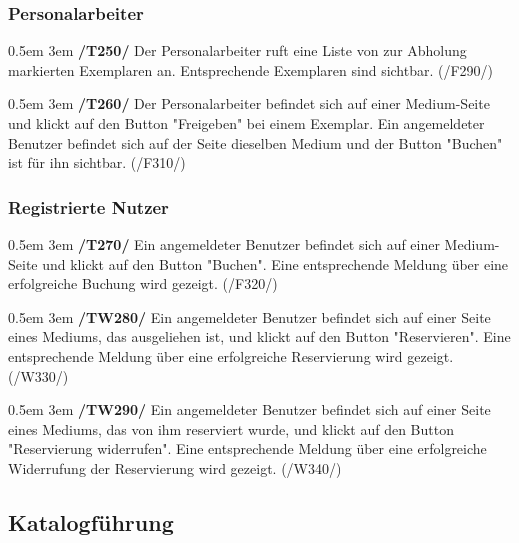 \documentclass{article}
\newcommand{\specification}[3]{
	{\parindent 0.5em \hangindent 3em \hypertarget{spec:#1:#2}{\textbf{/#1#2/}} #3 \par \nobreak \vspace*{0.5em}}
}
\begin{document}
		\subsubsection{Personalarbeiter}
			\specification{T}{250}{Der Personalarbeiter ruft eine Liste von zur Abholung markierten Exemplaren an. Entsprechende Exemplaren sind sichtbar. (/F290/)}
			\specification{T}{260}{Der Personalarbeiter befindet sich auf einer Medium-Seite und klickt auf den Button "Freigeben" bei einem Exemplar. Ein angemeldeter Benutzer befindet sich auf der Seite dieselben Medium und der Button "Buchen" ist für ihn sichtbar. (/F310/)}
		\subsubsection{Registrierte Nutzer}
			\specification{T}{270}{Ein angemeldeter Benutzer befindet sich auf einer Medium-Seite und klickt auf den Button "Buchen". Eine entsprechende Meldung über eine erfolgreiche Buchung wird gezeigt. (/F320/) }
			\specification{TW}{280}{Ein angemeldeter Benutzer befindet sich auf einer Seite eines Mediums, das ausgeliehen ist, und klickt auf den Button "Reservieren". Eine entsprechende Meldung über eine erfolgreiche Reservierung wird gezeigt. (/W330/) }
			\specification{TW}{290}{Ein angemeldeter Benutzer befindet sich auf einer Seite eines Mediums, das von ihm reserviert wurde, und klickt auf den Button "Reservierung widerrufen". Eine entsprechende Meldung über eine erfolgreiche Widerrufung der Reservierung wird gezeigt. (/W340/) }
				\subsection{Katalogführung}
\end{document}
